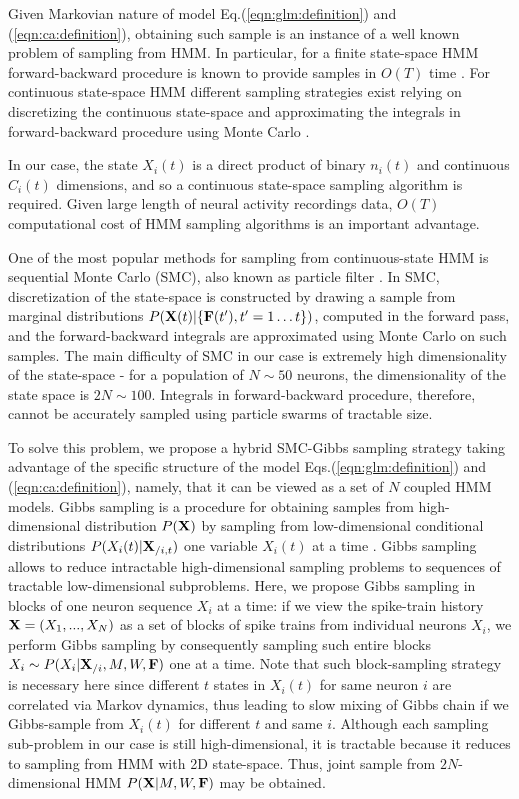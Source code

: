 Given Markovian nature of model Eq.(\ref{eqn:glm:definition}) and (\ref{eqn:ca:definition}), obtaining such sample is an instance of a well known problem of sampling from HMM. In particular, for a finite state-space HMM forward-backward procedure is known to provide samples in  $O(T)$ time \cite{RAB89}. For continuous state-space HMM different sampling strategies exist relying on discretizing the continuous state-space and approximating the integrals in forward-backward procedure using Monte Carlo \cite{DFG01, MINKAPHD, Fearnhead2003, koyama08, Andrieu2007, NBR03}.

In our case, the state $X_i(t)$ is a direct product of binary $n_i(t)$ and continuous $C_i(t)$ dimensions, and so a continuous state-space sampling algorithm is required.
Given large length of neural activity recordings data, $O(T)$ computational cost of HMM sampling algorithms is an important advantage.

One of the most popular methods for sampling from continuous-state HMM is sequential Monte Carlo (SMC), also known as particle filter \cite{DFG01}. In SMC, discretization of the state-space is constructed by drawing a sample from marginal distributions  $P({\bf X}(t)|\{{\bf F}(t'), t'=1\ldots t\})$, computed in the forward pass, and the forward-backward integrals are approximated using Monte Carlo on such samples. The main difficulty of SMC in our case is extremely high dimensionality of the state-space - for a population of $N\sim 50$ neurons, the dimensionality of the state space is $2N\sim 100$. Integrals in forward-backward procedure, therefore, cannot be accurately sampled using particle swarms of tractable size.

To solve this problem, we propose a hybrid SMC-Gibbs sampling strategy taking advantage of the specific structure of the model Eqs.(\ref{eqn:glm:definition}) and (\ref{eqn:ca:definition}), namely, that it can be viewed as a set of $N$ coupled HMM models. Gibbs sampling is a procedure for obtaining samples from high-dimensional distribution $P({\bf X})$ by sampling from low-dimensional conditional distributions $P(X_{i}(t)|{\bf X}_{/i, t})$ one variable $X_{i}(t)$ at a time \cite{Gelfand1990}.  Gibbs sampling allows to reduce intractable high-dimensional sampling problems to sequences of tractable low-dimensional subproblems.  Here, we propose Gibbs sampling in blocks of one neuron sequence $X_{i}$ at a time: if we view the spike-train history ${\bf X}=(X_1, ..., X_N)$ as a set of blocks of spike trains from individual neurons $X_i$, we perform Gibbs sampling by consequently sampling such entire blocks $X_i\sim P(X_{i}|{\bf X}_{/i}, M, W, {\bf F})$ one at a time.  Note that such block-sampling strategy is necessary here since different $t$ states in $X_i(t)$ for same neuron $i$ are correlated via Markov dynamics, thus leading to slow mixing of Gibbs chain if we Gibbs-sample from $X_i(t)$ for different $t$ and same $i$.  Although each sampling sub-problem in our case is still high-dimensional, it is tractable because it reduces to sampling from HMM with 2D state-space. Thus, joint sample from $2N$-dimensional HMM $P({\bf X}|M, W, {\bf F})$ may be obtained.

